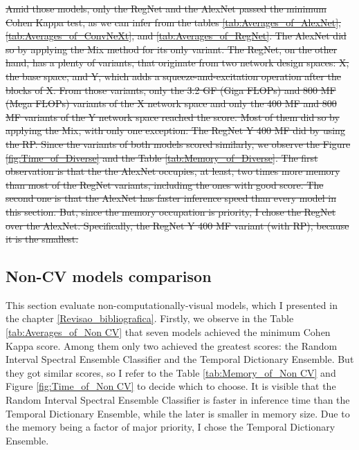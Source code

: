 \sout{
Amid those models, only the RegNet and the AlexNet passed the minimum Cohen Kappa test, as we can infer from the tables \ref{tab:Averages_of_AlexNet}, \ref{tab:Averages_of_ConvNeXt}, and \ref{tab:Averages_of_RegNet}. The AlexNet did so by applying the \gls{Mix} method for its only variant. The RegNet, on the other hand, has a plenty of variants, that originate from two network design spaces: X, the base space, and Y, which adds a squeeze-and-excitation operation after the blocks of X. From those variants, only the 3.2 GF (Giga FLOPs) and 800 MF (Mega FLOPs) variants of the X network space and only the 400 MF and 800 MF variants of the Y network space reached the score. Most of them did so by applying the \gls{Mix}, with only one exception: The RegNet Y 400 MF did by using the \gls{RP}. Since the variants of both models scored similarly, we observe the Figure \ref{fig:Time_of_Diverse} and the Table \ref{tab:Memory_of_Diverse}. The first observation is that the the AlexNet occupies, at least, two times more memory than most of the RegNet variants, including the ones with good score. The second one is that the AlexNet has faster inference speed than every model in this section. But, since the memory occupation is priority, I chose the RegNet over the AlexNet. Specifically, the RegNet Y 400 MF variant (with \gls{RP}), because it is the smallest.  
}






\FloatBarrier

\subsection{Non-CV models comparison}

This section evaluate non-computationally-visual models, which I presented in the chapter \ref{Revisao_bibliografica}. Firstly, we observe in the Table \ref{tab:Averages_of_Non CV} that seven models achieved the minimum Cohen Kappa score. Among them only two achieved the greatest scores: the Random Interval Spectral Ensemble Classifier and the Temporal Dictionary Ensemble. But they got similar scores, so I refer to the Table \ref{tab:Memory_of_Non CV} and Figure \ref{fig:Time_of_Non CV} to decide which to choose. It is visible that the Random Interval Spectral Ensemble Classifier is faster in inference time than the Temporal Dictionary Ensemble, while the later is smaller in memory size. Due to the memory being a factor of major priority, I chose the Temporal Dictionary Ensemble. 	 


